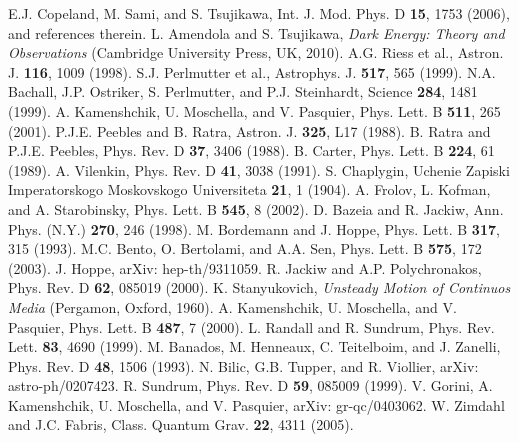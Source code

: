 \documentclass[two-column, nofootinbib]{revtex4-1}
\begin{document}
\begin{thebibliography}{150}
 E.J. Copeland, M. Sami, and S. Tsujikawa, {\color{magenta} Int. J. Mod. Phys. D {\bf 15}, 1753 (2006)}, and references therein.
 L. Amendola and S. Tsujikawa, {\it Dark Energy: Theory and Observations} (Cambridge University Press, UK, 2010).
 A.G. Riess et al., {\color{magenta} Astron. J. {\bf 116}, 1009 (1998)}.
 S.J. Perlmutter et al., {\color{magenta} Astrophys. J. {\bf 517}, 565 (1999)}.
 N.A. Bachall, J.P. Ostriker, S. Perlmutter, and P.J. Steinhardt, {\color{magenta} Science {\bf 284}, 1481 (1999)}.
 A. Kamenshchik, U. Moschella, and V. Pasquier, {\color{magenta} Phys. Lett. B {\bf 511}, 265 (2001)}.
 P.J.E. Peebles and B. Ratra, {\color{magenta} Astron. J. {\bf 325}, L17 (1988)}.
 B. Ratra and P.J.E. Peebles, {\color{magenta} Phys. Rev. D {\bf 37}, 3406 (1988)}.
 B. Carter, {\color{magenta} Phys. Lett. B {\bf 224}, 61 (1989)}.
 A. Vilenkin, {\color{magenta} Phys. Rev. D {\bf 41}, 3038 (1991)}.
 S. Chaplygin, {\color{magenta} Uchenie Zapiski Imperatorskogo Moskovskogo Universiteta {\bf 21}, 1 (1904)}.
 A. Frolov, L. Kofman, and A. Starobinsky, {\color{magenta} Phys. Lett. B {\bf 545}, 8 (2002)}.
 D. Bazeia and R. Jackiw, {\color{magenta} Ann. Phys. (N.Y.) {\bf 270}, 246 (1998)}.
 M. Bordemann and J. Hoppe, {\color{magenta} Phys. Lett. B {\bf 317}, 315 (1993)}.
 M.C. Bento, O. Bertolami, and A.A. Sen, {\color{magenta} Phys. Lett. B {\bf 575}, 172 (2003)}.
 J. Hoppe, arXiv: hep-th/9311059.
 R. Jackiw and A.P. Polychronakos, {\color{magenta} Phys. Rev. D {\bf 62}, 085019 (2000)}.
 K. Stanyukovich, {\it Unsteady Motion of Continuos Media} (Pergamon, Oxford, 1960).
 A. Kamenshchik, U. Moschella, and V. Pasquier, {\color{magenta}Phys. Lett. B {\bf 487}, 7 (2000)}.
 L. Randall and R. Sundrum, {\color{magenta} Phys. Rev. Lett. {\bf 83}, 4690 (1999)}.
 M. Banados, M. Henneaux, C. Teitelboim, and J. Zanelli, {\color{magenta} Phys. Rev. D {\bf 48}, 1506 (1993)}.
 N. Bilic, G.B. Tupper, and R. Viollier, arXiv: astro-ph/0207423.
 R. Sundrum, {\color{magenta} Phys. Rev. D {\bf 59}, 085009 (1999)}.
 V. Gorini, A. Kamenshchik, U. Moschella, and V. Pasquier, arXiv: gr-qc/0403062.
 W. Zimdahl and J.C. Fabris, {\color{magenta} Class. Quantum Grav. {\bf 22}, 4311 (2005)}.

\end{thebibliography}
\end{document}
